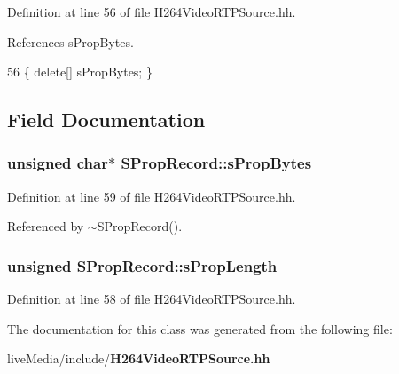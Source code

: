 Definition at line 56 of file H264\+Video\+R\+T\+P\+Source.\+hh.



References s\+Prop\+Bytes.


\begin{DoxyCode}
56 \{ \textcolor{keyword}{delete}[] sPropBytes; \}
\end{DoxyCode}


\subsection{Field Documentation}
\subsubsection[{s\+Prop\+Bytes}]{\setlength{\rightskip}{0pt plus 5cm}unsigned char$\ast$ S\+Prop\+Record\+::s\+Prop\+Bytes}\label{classSPropRecord_acdc795aba8fc8906b9360d3deb95a8e9}


Definition at line 59 of file H264\+Video\+R\+T\+P\+Source.\+hh.



Referenced by $\sim$\+S\+Prop\+Record().

\subsubsection[{s\+Prop\+Length}]{\setlength{\rightskip}{0pt plus 5cm}unsigned S\+Prop\+Record\+::s\+Prop\+Length}\label{classSPropRecord_a8bb123f6f7f3b28c84aa284f96b7b08a}


Definition at line 58 of file H264\+Video\+R\+T\+P\+Source.\+hh.



The documentation for this class was generated from the following file\+:\begin{DoxyCompactItemize}
\item 
live\+Media/include/{\bf H264\+Video\+R\+T\+P\+Source.\+hh}\end{DoxyCompactItemize}

